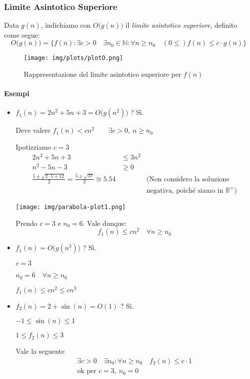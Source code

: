 \subsubsection{Limite Asintotico Superiore}
Data $g(n)$, indichiamo con $O \big(g(n) \big)$ il \emph{limite asintotico superiore}, definito come segue:
\begin{displaymath}
	O \big(g(n) \big) = \{ f(n) : \exists c > 0 \quad \exists n_0 \in \mathbb{N} : \forall n \geq n_0 \quad (0 \leq) f(n) \leq c \cdot g(n) \}
\end{displaymath}

\begin{figure}[!htb]
	\centering
	\texttt{[image: img/plots/plotO.png]}
	\caption{Rappresentazione del limite asintotico superiore per $f(n)$}
\end{figure}

\paragraph{Esempi}
\begin{itemize}
	\item $f_1(n) = 2n^2 + 5n + 3 = O \big(g(n^2) \big)$ ? Sì. \par
	Deve valere $f_1(n) < cn^2 \qquad \exists c > 0, \ n \geq n_0$ \par
	Ipotizziamo $c = 3$
	\begin{align*}
		2n^2 + 5n + 3 & \leq 3n^2 \\
		n^2 - 5n - 3 & \geq 0 \\
		\frac{5 \pm \sqrt{2 \cdot 5 + 12}}{2} = \frac{5 \pm \sqrt{37}}{2} \cong 5.54 && \text{(Non considero la soluzione} \\ && \text{negativa, poiché siamo in } \mathbb{R}^+ \text{)}
	\end{align*}
	\begin{center}
		\texttt{[image: img/parabola-plot1.png]}
	\end{center}
	
	Prendo $c = 3$ e $n_0 = 6$. Vale dunque:
	\begin{displaymath}
		f_1(n) \leq cn^2 \quad \forall n \geq n_0
	\end{displaymath}

	\item $f_1(n) = O \big(g(n^3) \big)$ ? Sì. \par
	$c = 3 $\par
	$n_0 = 6 \quad \forall n \geq n_0$ \par
	$f_1(n) \leq cn^2 \leq cn^3$
	
	\item $f_2(n) = 2 + \sin (n) = O(1)$ ? Sì. \par
	$-1 \leq \sin (n) \leq 1$ \par
	$1 \leq f_2(n) \leq 3$ \par
	Vale la seguente
	\begin{gather*}
		\exists c > 0 \quad \exists n_0 : \forall n \geq n_0 \quad f_2(n) \leq c \cdot 1 \\
		\text{ok per } c = 3, \ n_0 = 0
	\end{gather*}
\end{itemize}


